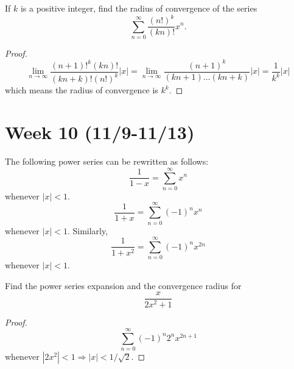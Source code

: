 \documentclass[openany]{book}
\begin{document}
\begin{prob}
    If $k$ is a positive integer, find the radius of convergence
of the series
\[
\sum_{n=0}^{\infty} \frac{(n!)^k}{(kn)!} x^n.
\]
\end{prob}
\begin{proof}
\begin{equation*}
    \lim_{n\to\infty}\frac{(n+1)!^k(kn)!}{(kn+k)!(n!)^k}|x|=\lim_{n\to\infty}\frac{(n+1)^k}{(kn+1)\dots(kn+k)}|x|=\frac{1}{k^k}|x|
\end{equation*}
which means the radius of convergence is $k^k$.
    
\end{proof}




\newpage
\section*{\centering Week 10 (11/9-11/13)}


\begin{example}
    The following power series can be rewritten as follows:
    \begin{equation*}
        \frac{1}{1-x}=\sum_{n=0}^\infty x^n
    \end{equation*}
    whenever $|x|<1$.
    \begin{equation*}
        \frac{1}{1+x}=\sum_{n=0}^\infty(-1)^nx^n
    \end{equation*}
    whenever $|x|<1$. Similarly,
    \begin{equation*}
        \frac{1}{1+x^2}=\sum_{n=0}^\infty(-1)^nx^{2n}
    \end{equation*}
    whenever $|x|<1$.
\end{example}



\begin{prob}
    Find the power series expansion and the convergence radius for 
    \begin{equation*}
        \frac{x}{2x^2+1}
    \end{equation*}
\end{prob}
\begin{proof}
    \begin{equation*}
        \sum_{n=0}^\infty(-1)^n2^nx^{2n+1}
    \end{equation*}
    whenever $|2x^2|<1\Rightarrow |x|<1/\sqrt{2}$.
\end{proof}
\end{document}
